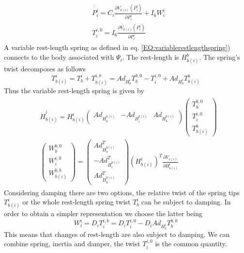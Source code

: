 \documentclass[a4paper,twoside, openright,12pt]{report}
\begin{document}
\begin{eqnarray}
\begin{aligned}
	&\dot{P_i^i} = C_i \frac{\partial V_{k(i)}(P_i^i)}{\partial P_i^i} + I_6 W_{i}^i \\
	&T_i^{i,0} = I_6 \frac{\partial V_{k(i)}(P_i^i)}{\partial P_i^i}
\end{aligned}
\end{eqnarray}  
A variable rest-length spring as defined in eq. \ref{EQ:variablerestlengthspring}) connects to the body associated with $\Psi_i$. The rest-length is $H_{b(i)}^b$. The spring's twist decomposes as follows
\begin{equation}
T_{b(i)}^i = T_b^i + T_{b(i)}^{i,b} = Ad_{H_b^i}T_b^{b,0} - T_i^{i,0} + Ad_{H_b^i} T_{b(i)}^{b}
\end{equation}
Thus the variable rest-length spring is given by
\begin{eqnarray}
\begin{aligned}
&\dot{H}_{b(i)}^i = H_{b(i)}^i \begin{pmatrix}
Ad_{H_b^{b(i)}} & - Ad_{H_i^{b(i)}} & Ad_{H_b^{b(i)}}\end{pmatrix} \begin{pmatrix} 
T_b^{b,0} \\ T_i^{i,0} \\ T_{b(i)}^b \end{pmatrix}\\
&\begin{pmatrix} 
W_b^{b,0} \\ W_i^{i,0} \\ W_{b(i)}^{b,b} \end{pmatrix} = \begin{pmatrix}
Ad_{H_b^{b(i)}}^T \\ - Ad_{H_i^{b(i)}}^T \\ Ad_{H_b^{b(i)}}^T\end{pmatrix}
(H_{b(i)}^i)^T
\frac{\partial V_{s(i)}}{\partial H_{b(i)}^i}
\end{aligned}
\end{eqnarray}
Considering damping there are two options, the relative twist of the spring tips $T_{b(i)}^i$ or the whole rest-length spring twist $T_b^i$ can be subject to damping. In order to obtain a simpler representation we choose the latter being
\begin{equation}
W_i^i = D_i T_i^{i,b} = D_i T_i^{i,0} - D_i Ad_{H_b^i} T_b^{b,0}
\end{equation}
This means that changes of rest-length are also subject to damping.
We can combine spring, inertia and damper, the twist $T_i^{i,0}$ is the common quantity.
\end{document}
